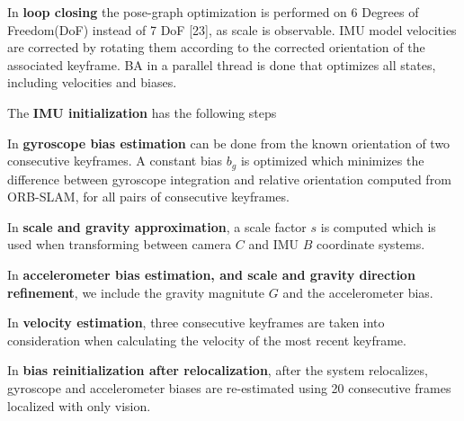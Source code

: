 In \textbf{loop closing} the pose-graph optimization is performed on 6 Degrees of Freedom(DoF) instead of 7 DoF [23], as scale is observable.  IMU model velocities are corrected by rotating them according to the corrected orientation of the associated keyframe.  BA in a parallel thread is done that optimizes all states, including velocities and biases. 

The \textbf{IMU initialization} has the following steps


In \textbf{gyroscope bias estimation} can be done from the known orientation of two consecutive keyframes. A constant bias $b_g$ is optimized which minimizes the difference between gyroscope integration and relative orientation computed from ORB-SLAM, for all pairs of consecutive keyframes.

In \textbf{scale and gravity approximation}, a scale  factor $s$ is computed which is used when transforming between camera $C$ and IMU $B$ coordinate systems.

In \textbf{accelerometer bias estimation, and scale and gravity direction refinement}, we include the gravity magnitute $G$ and the accelerometer bias.

In \textbf{velocity estimation}, three consecutive keyframes are taken into consideration when calculating the velocity of the most recent keyframe.

In \textbf{bias reinitialization after relocalization}, after the system relocalizes, gyroscope and accelerometer biases are re-estimated using 20 consecutive frames localized with only vision.



\FloatBarrier

